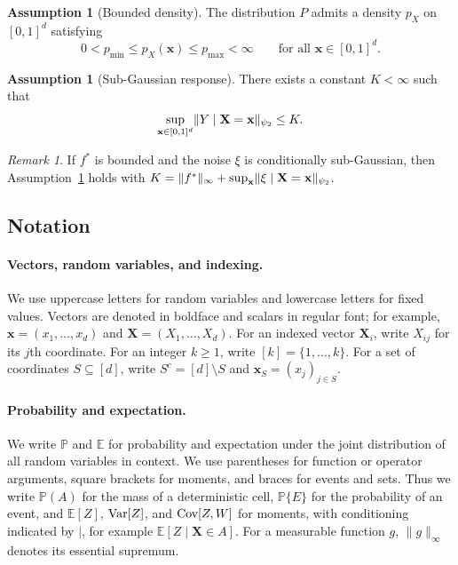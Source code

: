 \documentclass[11pt]{article}
\theoremstyle{plain}
\theoremstyle{definition}
\newtheorem{assumption}[theorem]{Assumption}
\theoremstyle{remark}
\newtheorem{remark}[theorem]{Remark}
\theoremstyle{plain}
\newcommand{\bx}{\mathbf{x}}
\newcommand{\bX}{\mathbf{X}}
\DeclarePairedDelimiter{\sgnorm}{\|}{\|_{\psi_2}}
\renewcommand{\P}{\mathbb{P}}
\newcommand{\E}{\mathbb{E}}
\newcommand{\Var}{\textnormal{Var}}
\newcommand{\Cov}{\textnormal{Cov}}
\newcommand{\1}{\mathbbm{1}}
\begin{document}
\begin{assumption}[Bounded density] \label{assum:bounded-density}
    The distribution $P$ admits a density $p_X$ on $[0,1]^d$ satisfying
    \begin{equation}
    \label{eq:design-regularity}
    0<p_{\min}\le p_X(\bx)\le p_{\max}<\infty
    \qquad\text{for all }\bx\in[0,1]^d.
\end{equation}
\end{assumption}

\begin{assumption}[Sub-Gaussian response]
    \label{assum:subgaussian-response}
There exists a constant $K<\infty$ such that
\[
\sup_{\bx\in[0,1]^d}\sgnorm{Y\mid \bX=\bx}\le K.
\]
\end{assumption}

\begin{remark}
    If $f^*$ is bounded and the noise $\xi$ is conditionally sub-Gaussian, then Assumption~\ref{assum:subgaussian-response} holds with $K = \|f^*\|_\infty + \sup_{\bx}\sgnorm{\xi\mid \bX=\bx}$.
\end{remark}


\subsection{Notation}
\label{sec:further_notation}

\paragraph{Vectors, random variables, and indexing.}
We use uppercase letters for random variables and lowercase letters for fixed values. Vectors are denoted in boldface and scalars in regular font; for example, $\bx=(x_1,\ldots,x_d)$ and $\bX=(X_1,\ldots,X_d)$. 
For an indexed vector $\bX_i$, write $X_{ij}$ for its $j$th coordinate. 
For an integer $k\ge 1$, write $[k]=\{1,\ldots,k\}$. 
For a set of coordinates $S\subseteq[d]$, write $S^c=[d]\setminus S$ and $\bx_S=(x_j)_{j\in S}$.

\paragraph{Probability and expectation.}
We write $\P$ and $\E$ for probability and expectation under the joint distribution of all random variables in context. 
We use parentheses for function or operator arguments, square brackets for moments, and braces for events and sets. Thus we write $\P(A)$ for the mass of a deterministic cell, $\P\{E\}$ for the probability of an event, and $\E[Z]$, $\Var[Z]$, and $\Cov[Z,W]$ for moments, with conditioning indicated by $\mid$, for example $\E[Z\mid \bX\in A]$. 
For a measurable function $g$, $\|g\|_\infty$ denotes its essential supremum.
\end{document}
